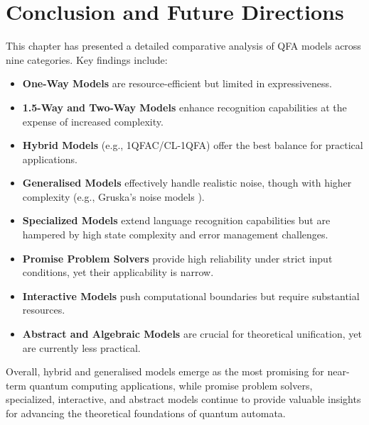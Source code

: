 \section{Conclusion and Future Directions}
This chapter has presented a detailed comparative analysis of QFA models across nine categories. Key findings include:
\begin{itemize}
    \item \textbf{One-Way Models} are resource-efficient but limited in expressiveness.
    \item \textbf{1.5-Way and Two-Way Models} enhance recognition capabilities at the expense of increased complexity.
    \item \textbf{Hybrid Models} (e.g., 1QFAC/CL-1QFA) offer the best balance for practical applications.
    \item \textbf{Generalised Models} effectively handle realistic noise, though with higher complexity (e.g., Gruska's noise models \cite{gruska2005}).
    \item \textbf{Specialized Models} extend language recognition capabilities but are hampered by high state complexity and error management challenges.
    \item \textbf{Promise Problem Solvers} provide high reliability under strict input conditions, yet their applicability is narrow.
    \item \textbf{Interactive Models} push computational boundaries but require substantial resources.
    \item \textbf{Abstract and Algebraic Models} are crucial for theoretical unification, yet are currently less practical.
\end{itemize}
Overall, hybrid and generalised models emerge as the most promising for near-term quantum computing applications, while promise problem solvers, specialized, interactive, and abstract models continue to provide valuable insights for advancing the theoretical foundations of quantum automata.

